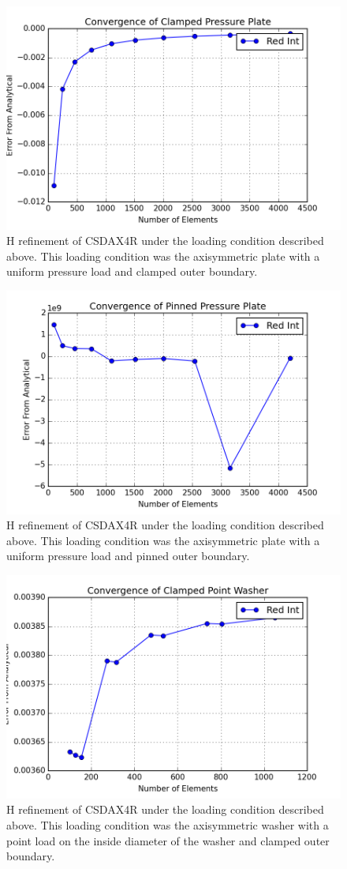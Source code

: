 \documentclass[10pt,letterpaper]{report}
\numberwithin{equation}{chapter}
\begin{document}
\begin{figure}[H]
\centering
\includegraphics[width=0.7\linewidth]{./GoodImages/Conv_PlPrCl_3}
\caption[H refinement of CSDAX4R]{H refinement of CSDAX4R under the loading condition described above. This loading condition was the axisymmetric plate with a uniform pressure load and clamped outer boundary.}
\label{fig:Conv_PlPoCl_3}
\end{figure}

\begin{figure}[H]
\centering
\includegraphics[width=0.7\linewidth]{./GoodImages/Conv_PlPrPi_3}
\caption[H refinement of CSDAX4R]{H refinement of CSDAX4R under the loading condition described above. This loading condition was the axisymmetric plate with a uniform pressure load and pinned outer boundary.}
\label{fig:Conv_PlPoCl_3}
\end{figure}

\begin{figure}[H]
\centering
\includegraphics[width=0.7\linewidth]{./GoodImages/Conv_WaPoCl_3}
\caption[H refinement of CSDAX4R]{H refinement of CSDAX4R under the loading condition described above. This loading condition was the axisymmetric washer with a point load on the inside diameter of the washer and clamped outer boundary.}
\label{fig:Conv_PlPoCl_3}
\end{figure}
\end{document}

